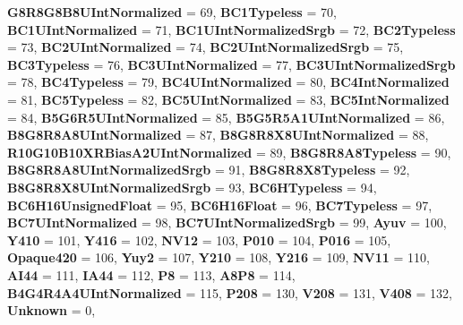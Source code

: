 \begin{DoxyCompactItemize}
{\bfseries G8\+R8\+G8\+B8\+U\+Int\+Normalized} = 69, 
{\bfseries B\+C1\+Typeless} = 70, 
\newline
{\bfseries B\+C1\+U\+Int\+Normalized} = 71, 
{\bfseries B\+C1\+U\+Int\+Normalized\+Srgb} = 72, 
{\bfseries B\+C2\+Typeless} = 73, 
{\bfseries B\+C2\+U\+Int\+Normalized} = 74, 
\newline
{\bfseries B\+C2\+U\+Int\+Normalized\+Srgb} = 75, 
{\bfseries B\+C3\+Typeless} = 76, 
{\bfseries B\+C3\+U\+Int\+Normalized} = 77, 
{\bfseries B\+C3\+U\+Int\+Normalized\+Srgb} = 78, 
\newline
{\bfseries B\+C4\+Typeless} = 79, 
{\bfseries B\+C4\+U\+Int\+Normalized} = 80, 
{\bfseries B\+C4\+Int\+Normalized} = 81, 
{\bfseries B\+C5\+Typeless} = 82, 
\newline
{\bfseries B\+C5\+U\+Int\+Normalized} = 83, 
{\bfseries B\+C5\+Int\+Normalized} = 84, 
{\bfseries B5\+G6\+R5\+U\+Int\+Normalized} = 85, 
{\bfseries B5\+G5\+R5\+A1\+U\+Int\+Normalized} = 86, 
\newline
{\bfseries B8\+G8\+R8\+A8\+U\+Int\+Normalized} = 87, 
{\bfseries B8\+G8\+R8\+X8\+U\+Int\+Normalized} = 88, 
{\bfseries R10\+G10\+B10\+X\+R\+Bias\+A2\+U\+Int\+Normalized} = 89, 
{\bfseries B8\+G8\+R8\+A8\+Typeless} = 90, 
\newline
{\bfseries B8\+G8\+R8\+A8\+U\+Int\+Normalized\+Srgb} = 91, 
{\bfseries B8\+G8\+R8\+X8\+Typeless} = 92, 
{\bfseries B8\+G8\+R8\+X8\+U\+Int\+Normalized\+Srgb} = 93, 
{\bfseries B\+C6\+H\+Typeless} = 94, 
\newline
{\bfseries B\+C6\+H16\+Unsigned\+Float} = 95, 
{\bfseries B\+C6\+H16\+Float} = 96, 
{\bfseries B\+C7\+Typeless} = 97, 
{\bfseries B\+C7\+U\+Int\+Normalized} = 98, 
\newline
{\bfseries B\+C7\+U\+Int\+Normalized\+Srgb} = 99, 
{\bfseries Ayuv} = 100, 
{\bfseries Y410} = 101, 
{\bfseries Y416} = 102, 
\newline
{\bfseries N\+V12} = 103, 
{\bfseries P010} = 104, 
{\bfseries P016} = 105, 
{\bfseries Opaque420} = 106, 
\newline
{\bfseries Yuy2} = 107, 
{\bfseries Y210} = 108, 
{\bfseries Y216} = 109, 
{\bfseries N\+V11} = 110, 
\newline
{\bfseries A\+I44} = 111, 
{\bfseries I\+A44} = 112, 
{\bfseries P8} = 113, 
{\bfseries A8\+P8} = 114, 
\newline
{\bfseries B4\+G4\+R4\+A4\+U\+Int\+Normalized} = 115, 
{\bfseries P208} = 130, 
{\bfseries V208} = 131, 
{\bfseries V408} = 132, 
\newline
{\bfseries Unknown} = 0, 

\end{DoxyCompactItemize}
